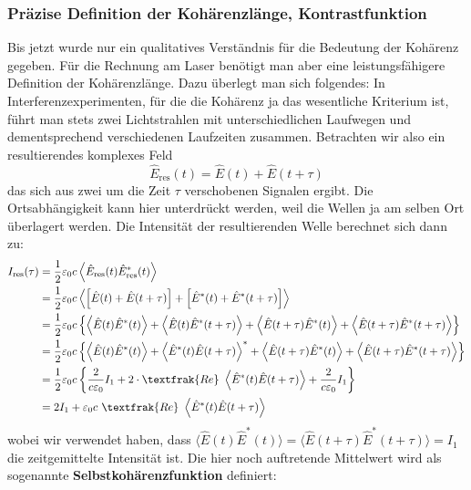 \documentclass[german,  %
parskip=full,  %
]{scrartcl}
\begin{document}
\subsubsection{Präzise Definition der Kohärenzlänge, Kontrastfunktion}
Bis jetzt wurde nur ein qualitatives Verständnis für die Bedeutung der Kohärenz gegeben. Für die Rechnung am Laser benötigt man aber eine leistungsfähigere Definition der Kohärenzlänge. Dazu überlegt man sich folgendes: In Interferenzexperimenten, für die die Kohärenz ja das wesentliche Kriterium ist, führt man stets zwei Lichtstrahlen mit unterschiedlichen Laufwegen und dementsprechend verschiedenen Laufzeiten zusammen. Betrachten wir also ein resultierendes komplexes Feld
\[\hat{E}_{\mathrm{res}}(t) = \hat{E}(t) + \hat{E}(t+\tau)\]
das sich aus zwei um die Zeit \(\tau\) verschobenen Signalen ergibt. Die Ortsabhängigkeit kann hier unterdrückt werden, weil die Wellen ja am selben Ort überlagert werden. Die Intensität der resultierenden Welle berechnet sich dann zu:
\begin{align*}
I_{\mathrm{res}}(\tau) &= \frac{1}{2}\varepsilon_0 c \left\langle \hat{E}_{\mathrm{res}}(t) \hat{E}_{\mathrm{res}}^{*}(t)\right\rangle \\
&= \frac{1}{2}\varepsilon_0 c \left\langle \left[\hat{E}(t) + \hat{E}(t+\tau)\right] + \left[\hat{E}^{*}(t) + \hat{E}^{*}(t+\tau)\right]\right\rangle \\
&= \frac{1}{2}\varepsilon_0 c \left\lbrace\left\langle \hat{E}(t)\hat{E}^{*}(t)\right\rangle + \left\langle\hat{E}(t)\hat{E}^{*}(t+\tau)\right\rangle + \left\langle\hat{E}(t+\tau)\hat{E}^{*}(t)\right\rangle + \left\langle\hat{E}(t+\tau)\hat{E}^{*}(t+\tau) \right\rangle \right\rbrace\\
&= \frac{1}{2}\varepsilon_0 c \left\lbrace\left\langle \hat{E}(t)\hat{E}^{*}(t)\right\rangle + \left\langle\hat{E}^{*}(t)\hat{E}(t+\tau)\right\rangle^{*} + \left\langle\hat{E}(t+\tau)\hat{E}^{*}(t)\right\rangle + \left\langle\hat{E}(t+\tau)\hat{E}^{*}(t+\tau) \right\rangle \right\rbrace\\
&= \frac{1}{2}\varepsilon_0 c \left\lbrace \frac{2}{c \varepsilon_0}I_1 + 2\cdot\textfrak{Re} \ \left\langle\hat{E}^{*}(t)\hat{E}(t+\tau)\right\rangle + \frac{2}{c \varepsilon_0}I_1\right\rbrace \\
&= 2 I_1 + \varepsilon_0 c \ \textfrak{Re} \ \left\langle\hat{E}^{*}(t)\hat{E}(t+\tau)\right\rangle 
\end{align*} 
wobei wir verwendet haben, dass \(\langle \hat{E}(t)\hat{E}^{*}(t)\rangle = \langle\hat{E}(t+\tau)\hat{E}^{*}(t+\tau) \rangle = I_1\) die zeitgemittelte Intensität ist. Die hier noch auftretende Mittelwert wird als sogenannte \textbf{Selbstkohärenzfunktion} definiert:
\end{document}
